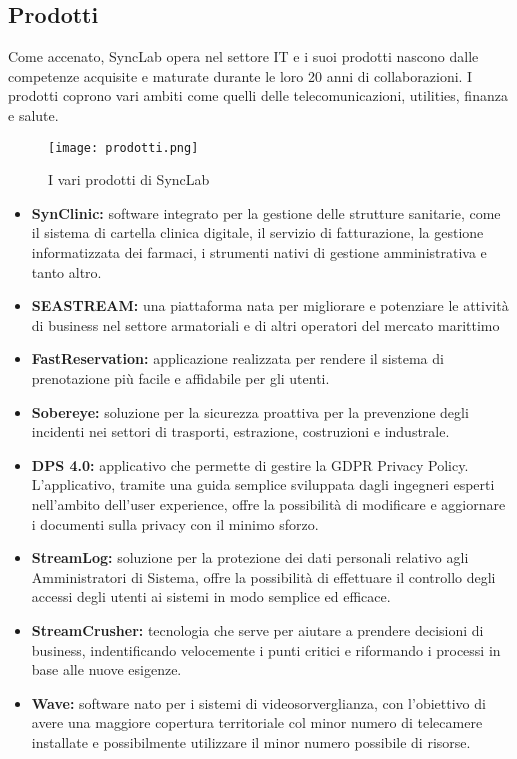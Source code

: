 \subsection{Prodotti}
Come accenato, SyncLab opera nel settore IT e i suoi prodotti nascono dalle competenze acquisite e maturate durante le loro 20 anni di collaborazioni. I prodotti coprono vari ambiti come quelli delle telecomunicazioni, utilities, finanza e salute.
\begin{figure}[H]
    \centering
    \texttt{[image: prodotti.png]}
    \caption{I vari prodotti di SyncLab}
\end{figure}
\begin{itemize}
    \item \textbf{SynClinic:} software integrato per la gestione delle strutture sanitarie, come il sistema di cartella clinica digitale, il servizio di fatturazione, la gestione informatizzata dei farmaci, i strumenti nativi di gestione amministrativa e tanto altro.
    \item \textbf{SEASTREAM:} una piattaforma nata per migliorare e potenziare le attività di business nel settore armatoriali e di altri operatori del mercato marittimo
    \item \textbf{FastReservation:} applicazione realizzata per rendere il sistema di prenotazione più facile e affidabile per gli utenti.
    \item \textbf{Sobereye:} soluzione per la sicurezza proattiva per la prevenzione degli incidenti nei settori di trasporti, estrazione, costruzioni e industrale.
    \item \textbf{DPS 4.0:} applicativo che permette di gestire la GDPR Privacy Policy. L'applicativo, tramite una guida semplice sviluppata dagli ingegneri esperti nell'ambito dell'user experience, offre la possibilità di modificare e aggiornare i documenti sulla privacy con il minimo sforzo.
    \item \textbf{StreamLog:} soluzione per la protezione dei dati personali relativo agli Amministratori di Sistema, offre la possibilità di effettuare il controllo degli accessi degli utenti ai sistemi in modo semplice ed efficace.
    \item \textbf{StreamCrusher:} tecnologia che serve per aiutare a prendere decisioni di business, indentificando velocemente i punti critici e riformando i processi in base alle nuove esigenze.
    \item \textbf{Wave:} software nato per i sistemi di videosorverglianza, con l'obiettivo di avere una maggiore copertura territoriale col minor numero di telecamere installate e possibilmente utilizzare il minor numero possibile di risorse.
\end{itemize}

